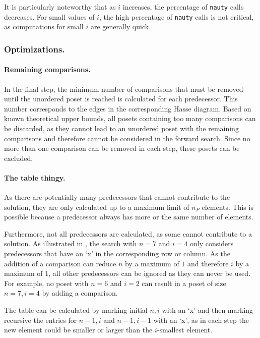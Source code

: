 \documentclass[twoside,leqno,twocolumn]{article}
\begin{document}
It is particularly noteworthy that as $i$ increases, the percentage of \texttt{nauty} calls decreases.
For small values of $i$, the high percentage of \texttt{nauty} calls is not critical, as computations for small $i$ are generally quick.

\subsubsection{Optimizations.}

\paragraph{Remaining comparisons.}
In the final step, the minimum number of comparisons that must be removed until the unordered poset is reached is calculated for each predecessor.
This number corresponds to the edges in the corresponding Hasse diagram.
Based on known theoretical upper bounds, all posets containing too many comparisons can be discarded, as they cannot lead to an unordered poset with the remaining comparisons and therefore cannot be considered in the forward search.
Since no more than one comparison can be removed in each step, these posets can be excluded.

\paragraph{The table thingy.}
As there are potentially many predecessors that cannot contribute to the solution, they are only calculated up to a maximum limit of $n_P$ elements. This is possible because a predecessor always has more or the same number of elements.

Furthermore, not all predecessors are calculated, as some cannot contribute to a solution.
As illustrated in , the search with $n = 7$ and $i = 4$ only considers predecessors that have an `x' in the corresponding row or column. As the addition of a comparison can reduce $n$ by a maximum of $1$ and therefore $i$ by a maximum of $1$, all other predecessors can be ignored as they can never be used.
For example, no poset with $n = 6$ and $i = 2$ can result in a poset of size $n = 7, i = 4$ by adding a comparison.

The table can be calculated by marking initial $n, i$ with an `x' and then marking recursive the entries for $n - 1, i$ and $n - 1, i - 1$ with an `x', as in each step the new element could be smaller or larger than the $i$-smallest element.
\end{document}
